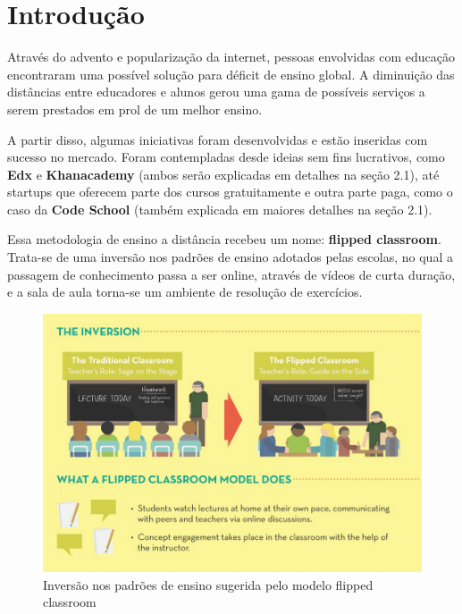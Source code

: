 \documentclass[graduacao,brazil]{ThesisPUC}
\begin{document}
\chapter{Introdu\c{c}\~{a}o}

Atrav\'{e}s do advento e populariza\c{c}\~{a}o da internet, pessoas envolvidas com educa\c{c}\~{a}o
encontraram uma poss\'{i}vel solu\c{c}\~{a}o para d\'{e}ficit de ensino global. A diminui\c{c}\~{a}o
das dist\^{a}ncias entre educadores e alunos gerou uma gama de poss\'{i}veis servi\c{c}os a serem prestados
em prol de um melhor ensino.

A partir disso, algumas iniciativas foram desenvolvidas e est\~{a}o inseridas com sucesso no
mercado. Foram contempladas desde ideias sem fins lucrativos, como \textbf{Edx} e \textbf{Khanacademy}
(ambos serão explicadas em detalhes na seção 2.1), at\'{e} startups que oferecem parte dos cursos
gratuitamente e outra parte paga, como o caso da \textbf{Code School} (tamb\'{e}m explicada em maiores
detalhes na seção 2.1).

Essa metodologia de ensino a dist\^{a}ncia recebeu um nome: \textbf{flipped classroom}. Trata-se de
uma invers\~{a}o nos padr\~{o}es de ensino adotados pelas escolas, no qual a passagem de
conhecimento passa a ser online, atrav\'{e}s de v\'{i}deos de curta dura\c{c}\~{a}o, e a sala de aula torna-se
um ambiente de resolu\c{c}\~{a}o de exerc\'{i}cios.

\begin{figure}[h]
    \includegraphics*[width=\linewidth]{Imagens/flipped_classroom.png}
    \caption{Inversão nos padrões de ensino sugerida pelo modelo flipped classroom}
\end{figure}
\end{document}
